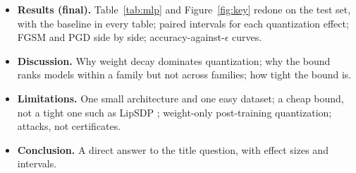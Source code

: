 \documentclass{article}
\begin{document}
\begin{itemize}
  \item \textbf{Results (final).} Table~\ref{tab:mlp} and Figure~\ref{fig:key} redone on the test set, with the baseline in every table; paired intervals for each quantization effect; FGSM and PGD side by side; accuracy-against-$\epsilon$ curves.
  \item \textbf{Discussion.} Why weight decay dominates quantization; why the bound ranks models within a family but not across families; how tight the bound is.
  \item \textbf{Limitations.} One small architecture and one easy dataset; a cheap bound, not a tight one such as LipSDP \citep{fazlyab2019efficient}; weight-only post-training quantization; attacks, not certificates.
  \item \textbf{Conclusion.} A direct answer to the title question, with effect sizes and intervals.
\end{itemize}



\end{document}
